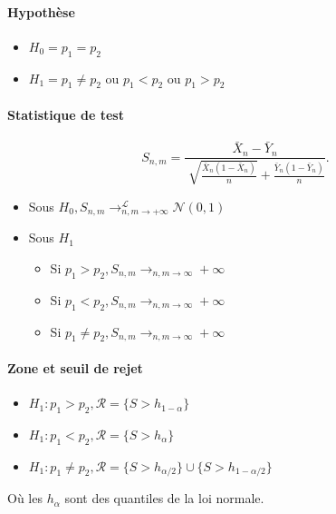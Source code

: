 \documentclass{article}
\theoremstyle{plain}%
\theoremstyle{definition}
\theoremstyle{remark}
\begin{document}
\paragraph*{Hypothèse}\begin{itemize}
    \item $ H_0 = p_1 = p_2 $ 
    \item $ H_1 = p_1 \neq p_2 $ ou $ p_1 < p_2 $ ou $ p_1 > p_2 $ 
\end{itemize}

\paragraph*{Statistique de test}
\[
    S_{n,m} = \frac{\bar{X}_n - \bar{Y}_n}{\sqrt[]{ \frac{\bar{X}_n (1 - \bar{X}_n)}{n}} + \frac{\bar{Y}_n (1 - \bar{Y}_n)}{n}}
.\]\begin{itemize}
    \item Sous $ H_0, S_{n,m} \to ^\mathcal{L}_{n,m \to +\infty } \mathcal{N}(0,1)$
    \item Sous $ H_1 $ \begin{itemize}
        \item Si $ p_1 > p_2, S_{n,m} \to_{n,m \to \infty } +\infty  $ 
        \item Si $ p_1 < p_2, S_{n,m} \to_{n,m \to \infty } +\infty  $ 
        \item Si $ p_1 \neq  p_2, S_{n,m} \to_{n,m \to \infty } +\infty  $ 
    \end{itemize}
\end{itemize}

\paragraph*{Zone et seuil de rejet}
\begin{itemize}
    \item $ H_1 : p_1 > p_2, \mathcal{R} = \{S > h_{1 -\alpha }\} $ 
    \item $ H_1 : p_1 < p_2, \mathcal{R} = \{S > h_{\alpha }\} $ 
    \item $ H_1 : p_1 \neq  p_2, \mathcal{R} = \{S > h_{\alpha /2}\} \cup \{S > h_{1 - \alpha /2}\} $ 
\end{itemize}
Où les $ h_{\alpha } $ sont des quantiles de la loi normale.
\end{document}
